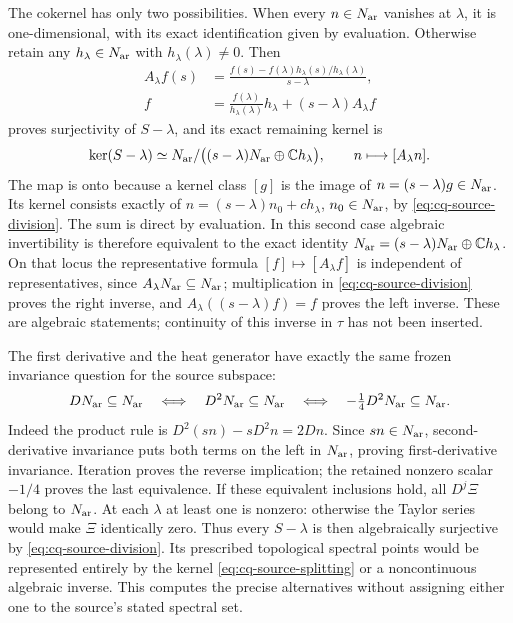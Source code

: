 The cokernel has only two possibilities. When every $n\in N_{\rm ar}$
vanishes at $\lambda$, it is one-dimensional, with its exact
identification given by evaluation. Otherwise retain any
$h_\lambda\in N_{\rm ar}$ with $h_\lambda(\lambda)\ne0$. Then
\begin{equation}\label{eq:cq-source-division}
 \begin{aligned}
 A_\lambda f(s)&=
  \frac{f(s)-f(\lambda)h_\lambda(s)/h_\lambda(\lambda)}{s-\lambda},\\
 f&=\frac{f(\lambda)}{h_\lambda(\lambda)}h_\lambda
                                      +(s-\lambda)A_\lambda f
 \end{aligned}
\end{equation}
proves surjectivity of $S-\lambda$, and its exact remaining kernel is
\begin{equation}\label{eq:cq-source-splitting}
 \ker(S-\lambda)\simeq
 N_{\rm ar}/\bigl((s-\lambda)N_{\rm ar}\oplus\mathbb C h_\lambda\bigr),
 \qquad n\longmapsto[A_\lambda n].
\end{equation}
The map is onto because a kernel class $[g]$ is the image of
$n=(s-\lambda)g\in N_{\rm ar}$. Its kernel consists exactly of
$n=(s-\lambda)n_0+c h_\lambda$, $n_0\in N_{\rm ar}$, by
\eqref{eq:cq-source-division}. The sum is direct by evaluation.
In this second case algebraic invertibility is therefore equivalent
to the exact identity
$N_{\rm ar}=(s-\lambda)N_{\rm ar}\oplus\mathbb C h_\lambda$.
On that locus the representative formula $[f]\mapsto[A_\lambda f]$
is independent of representatives, since $A_\lambda N_{\rm ar}\subseteq
N_{\rm ar}$; multiplication in \eqref{eq:cq-source-division} proves the
right inverse, and $A_\lambda((s-\lambda)f)=f$ proves the left
inverse. These are algebraic statements; continuity of this inverse
in $\tau$ has not been inserted.

The first derivative and the heat generator have exactly the same
frozen invariance question for the source subspace:
\begin{equation}\label{eq:cq-source-D-equivalence}
 DN_{\rm ar}\subseteq N_{\rm ar}
 \quad\Longleftrightarrow\quad D^2N_{\rm ar}\subseteq N_{\rm ar}
 \quad\Longleftrightarrow\quad -\tfrac14D^2N_{\rm ar}\subseteq N_{\rm ar}.
\end{equation}
Indeed the product rule is
$D^2(sn)-sD^2n=2Dn$. Since $sn\in N_{\rm ar}$, second-derivative
invariance puts both terms on the left in $N_{\rm ar}$, proving
first-derivative invariance. Iteration proves the reverse implication;
the retained nonzero scalar $-1/4$ proves the last equivalence.
If these equivalent inclusions hold, all $D^j\Xi$ belong to
$N_{\rm ar}$. At each $\lambda$ at least one is nonzero: otherwise
the Taylor series would make $\Xi$ identically zero. Thus every
$S-\lambda$ is then algebraically surjective by
\eqref{eq:cq-source-division}. Its prescribed topological spectral
points would be represented entirely by the kernel
\eqref{eq:cq-source-splitting} or a noncontinuous algebraic inverse.
This computes the precise alternatives without assigning either
one to the source's stated spectral set.

